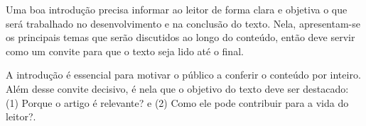 Uma boa introdução precisa informar ao leitor de forma clara e objetiva o que será trabalhado no desenvolvimento e na conclusão do texto. Nela, apresentam-se os principais temas que serão discutidos ao longo do conteúdo, então deve servir como um convite para que o texto seja lido até o final.

A introdução é essencial para motivar o público a conferir o conteúdo por inteiro. Além desse convite decisivo, é nela que o objetivo do texto deve ser destacado: (1) Porque o artigo é relevante? e (2) Como ele pode contribuir para a vida do leitor?.



